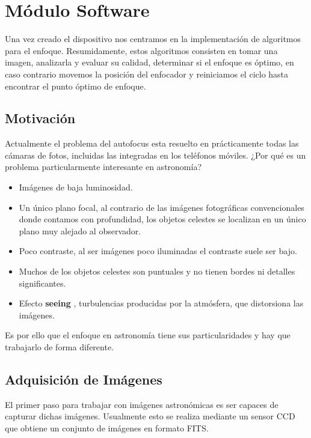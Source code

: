 \chapter{Módulo Software}



Una vez creado el dispositivo nos centramos en la implementación de algoritmos para el enfoque. Resumidamente, estos algoritmos consisten en tomar una imagen, analizarla y evaluar su calidad, determinar si el enfoque es óptimo, en caso contrario movemos la posición del enfocador y reiniciamos el ciclo hasta encontrar el punto óptimo de enfoque.

\section{Motivación}

Actualmente el problema del autofocus esta resuelto en prácticamente todas las cámaras de fotos, incluidas las integradas en los teléfonos móviles. ¿Por qué es un problema particularmente interesante en astronomía?

\begin{itemize}
	\item Imágenes de baja luminosidad.
	\item Un único plano focal, al contrario de las imágenes fotográficas convencionales donde contamos con profundidad, los objetos celestes se localizan en un único plano muy alejado al observador.
	\item Poco contraste, al ser imágenes poco iluminadas el contraste suele ser bajo.
	\item Muchos de los objetos celestes son puntuales y no tienen bordes ni detalles significantes. 
	\item Efecto \textbf{seeing} \cite{seeing}, turbulencias producidas por la atmósfera, que distorsiona las imágenes. 
	
\end{itemize}

Es por ello que el enfoque en astronomía tiene sus particularidades y hay que trabajarlo de forma diferente.


\section{Adquisición de Imágenes}
El primer paso para trabajar con imágenes astronómicas es ser capaces de capturar dichas imágenes. Usualmente esto se realiza mediante un sensor CCD que obtiene un conjunto de imágenes en formato FITS.

